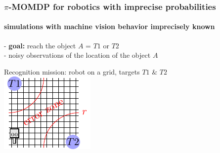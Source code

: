\documentclass[12pt,svgnames,table]{beamer}
\newcommand{\paren}[1]{\left( \left. #1 \right. \right)}
\newcommand{\sachant}{\, \right| \left. \,}
\begin{document}
\begin{frame}
\frametitle{$\pi$-MOMDP for robotics with imprecise probabilities}
\framesubtitle{\footnotesize simulations with machine vision behavior imprecisely known}
\vspace{0.4cm}
- \textbf{goal:} reach the object $A$ = $T1$ or $T2$ \\
- noisy observations of the location of the object $A$%
\begin{exampleblock}{Recognition mission: robot on a grid, targets $T1$ $\&$ $T2$}
\includegraphics[width=.45\linewidth]{robotgrid.pdf} 
\end{exampleblock}
\end{frame}
\end{document}
